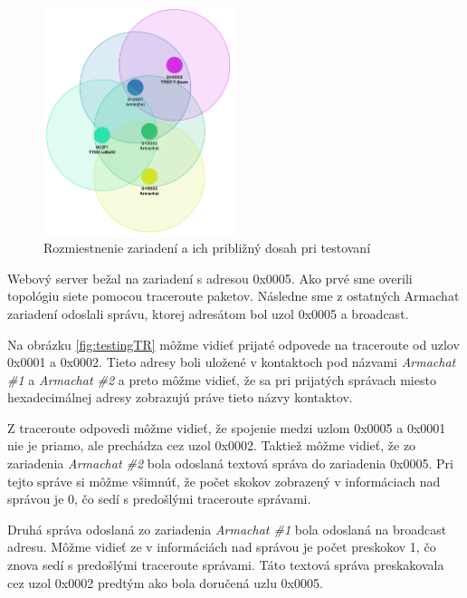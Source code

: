 \documentclass[slovak,master]{diploma}
\begin{document}
\begin{figure}[h!]
  \centering
  \includegraphics[width=0.5\textwidth]{Figures/topology.png}
  \caption{Rozmiestnenie zariadení a ich približný dosah  pri testovaní}
  \label{fig:topology}
\end{figure}

\newpage
Webový server bežal na zariadení s adresou 0x0005. Ako prvé sme overili topológiu siete pomocou traceroute paketov. 
Následne sme z ostatných Armachat zariadení odoslali správu, ktorej adresátom bol uzol 0x0005 a broadcast.

Na obrázku \ref{fig:testingTR} môžme vidieť prijaté odpovede na traceroute od uzlov 0x0001 a 0x0002. Tieto adresy boli uložené 
v kontaktoch pod názvami \emph{Armachat \#1} a \emph{Armachat \#2} a preto môžme vidieť, že sa pri prijatých správach miesto hexadecimálnej adresy 
zobrazujú práve tieto názvy kontaktov.

Z traceroute odpovedi môžme vidieť, že spojenie medzi uzlom 0x0005 a 0x0001 nie je priamo, ale prechádza cez uzol 0x0002. Taktiež môžme vidieť, 
že zo zariadenia \emph{Armachat \#2} bola odoslaná textová správa do zariadenia 0x0005. Pri tejto správe si môžme všimnúť, že počet skokov 
zobrazený v informáciach nad správou je 0, čo sedí s predošlými traceroute správami.

Druhá správa odoslaná zo zariadenia \emph{Armachat \#1} bola odoslaná na broadcast adresu. Môžme vidieť ze v informáciách nad správou je počet 
preskokov 1, čo znova sedí s predošlými traceroute správami. Táto textová správa preskakovala cez uzol 0x0002 predtým ako bola doručená 
uzlu 0x0005.
\end{document}
